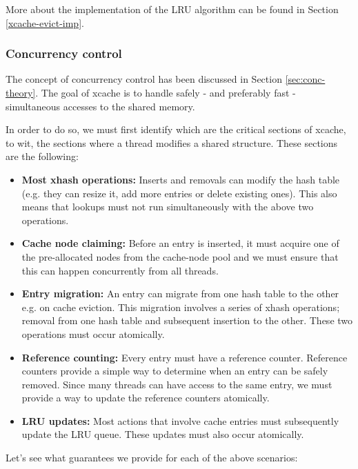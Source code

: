 More about the implementation of the LRU algorithm can be found in Section 
\ref{xcache-evict-imp}.

\subsubsection{Concurrency control}

The concept of concurrency control has been discussed in Section 
\ref{sec:conc-theory}.  The goal of xcache is to handle safely - and preferably 
fast - simultaneous accesses to the shared memory.

In order to do so, we must first identify which are the critical sections of 
xcache, to wit, the sections where a thread modifies a shared structure. These 
sections are the following:

\begin{itemize}
	\item
		\textbf{Most xhash operations:} Inserts and removals can modify 
		the hash table (e.g. they can resize it, add more entries or 
		delete existing ones). This also means that lookups must not 
		run simultaneously with the above two operations.
	\item
		\textbf{Cache node claiming:} Before an entry is inserted, it 
		must	acquire one of the pre-allocated nodes from the 
		cache-node pool and we must ensure that this can happen 
		concurrently from all threads.
	\item
		\textbf{Entry migration:} An entry can migrate from one hash 
		table to the other e.g. on cache eviction. This migration 
		involves a series of xhash operations; removal from one hash 
		table and subsequent insertion to the other. These two 
		operations must occur atomically.
	\item
		\textbf{Reference counting:} Every entry must have a reference 
		counter.  Reference counters provide a simple way to determine 
		when an entry can be safely removed. Since many threads can 
		have access to the same entry, we must provide a way to update 
		the reference counters atomically.
	\item
		\textbf{LRU updates:} Most actions that involve cache entries 
		must subsequently update the LRU queue. These updates must also 
		occur atomically.
\end{itemize}

Let's see what guarantees we provide for each of the above scenarios:

